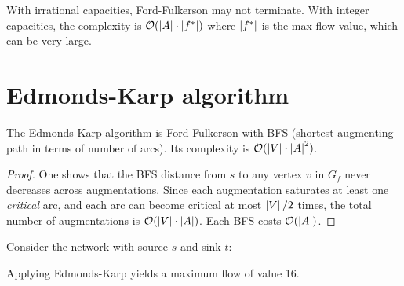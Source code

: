 \begin{warning}[title=\textbf{Termination of Ford-Fulkerson}]
With irrational capacities, Ford-Fulkerson may not terminate. With integer
capacities, the complexity is $\mathcal{O}(\left| A \right| \cdot \left| f^* \right|)$ where
$\left| f^* \right|$ is the max flow value, which can be very large.
\end{warning}

\section{Edmonds-Karp algorithm}

\begin{theorem}
The Edmonds-Karp algorithm is Ford-Fulkerson with BFS (shortest augmenting
path in terms of number of arcs). Its complexity is
$\mathcal{O}(\left| V \right| \cdot \left| A \right|^2)$.
\end{theorem}

\begin{proof}
One shows that the BFS distance from $s$ to any vertex $v$ in $G_f$ never
decreases across augmentations. Since each augmentation saturates at least one
\emph{critical} arc, and each arc can become critical at most $\left| V \right|/2$
times, the total number of augmentations is $\mathcal{O}(\left| V \right| \cdot
\left| A \right|)$. Each BFS costs $\mathcal{O}(\left| A \right|)$.
\end{proof}

\begin{example}
Consider the network with source $s$ and sink $t$:
\begin{center}
\end{center}

Applying Edmonds-Karp yields a maximum flow of value 16.
\end{example}

